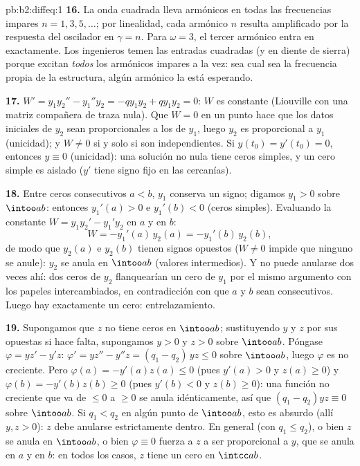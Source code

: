 \begin{solution}{pb:b2:diffeq:1}
\textbf{16.} La onda cuadrada lleva armónicos en todas las
frecuencias impares $n = 1, 3, 5, \dots$; por linealidad, cada
armónico $n$ resulta amplificado por la respuesta del oscilador en
$\gamma = n$. Para $\omega = 3$, el tercer armónico entra en
 exactamente. Los ingenieros temen las entradas cuadradas
(y en diente de sierra) porque excitan \emph{todos} los armónicos
impares a la vez: sea cual sea la frecuencia propia de la estructura,
algún armónico la está esperando.

\textbf{17.} $W' = y_1y_2'' - y_1''y_2 = -qy_1y_2 + qy_1y_2 = 0$: $W$
es constante (Liouville con una matriz compañera de traza nula). Que
$W = 0$ en un punto hace que los datos iniciales de $y_2$ sean
proporcionales a los de $y_1$, luego $y_2$ es proporcional a $y_1$
(unicidad); y $W \neq 0$ si y solo si son independientes. Si $y(t_0)
= y'(t_0) = 0$, entonces $y \equiv 0$ (unicidad): una solución no
nula tiene ceros simples, y un cero simple es aislado ($y'$ tiene
signo fijo en las cercanías).

\textbf{18.} Entre ceros consecutivos $a < b$, $y_1$ conserva un
signo; digamos $y_1 > 0$ sobre $\intoo ab$: entonces $y_1'(a) > 0$ e
$y_1'(b) < 0$ (ceros simples). Evaluando la constante $W = y_1y_2' -
y_1'y_2$ en $a$ y en $b$:
\[
W = -y_1'(a)\,y_2(a) = -y_1'(b)\,y_2(b) ,
\]
de modo que $y_2(a)$ e $y_2(b)$ tienen signos opuestos ($W \neq 0$
impide que ninguno se anule): $y_2$ se anula en $\intoo ab$ (valores
intermedios). Y no puede anularse dos veces ahí: dos ceros de $y_2$
flanquearían un cero de $y_1$ por el mismo argumento con los papeles
intercambiados, en contradicción con que $a$ y $b$ sean consecutivos.
Luego hay exactamente un cero: entrelazamiento.

\textbf{19.} Supongamos que $z$ no tiene ceros en $\intoo ab$;
sustituyendo $y$ y $z$ por sus opuestas si hace falta, supongamos $y
> 0$ y $z > 0$ sobre $\intoo ab$. Póngase $\varphi = yz' - y'z$:
$\varphi' = yz'' - y''z = (q_1 - q_2)\,yz \leq 0$ sobre $\intoo ab$,
luego $\varphi$ es no creciente. Pero $\varphi(a) = -y'(a)z(a) \leq
0$ (pues $y'(a) > 0$ y $z(a) \geq 0$) y $\varphi(b) = -y'(b)z(b) \geq
0$ (pues $y'(b) < 0$ y $z(b) \geq 0$): una función no creciente que
va de $\leq 0$ a $\geq 0$ se anula idénticamente, así que $(q_1 -
q_2)yz \equiv 0$ sobre $\intoo ab$. Si $q_1 < q_2$ en algún punto de
$\intoo ab$, esto es absurdo (allí $y, z > 0$): $z$ debe anularse
estrictamente dentro. En general (con $q_1 \leq q_2$), o bien $z$ se
anula en $\intoo ab$, o bien $\varphi \equiv 0$ fuerza a $z$ a ser
proporcional a $y$, que se anula en $a$ y en $b$: en todos los casos,
$z$ tiene un cero en $\intcc ab$.


\end{solution}
